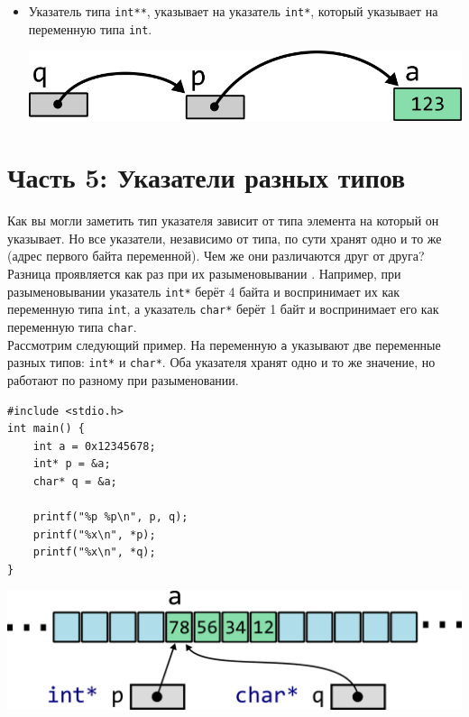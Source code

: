 \documentclass{article}
\begin{document}
\begin{itemize}
\item Указатель типа \texttt{int**}, указывает на указатель \texttt{int*}, который указывает на переменную типа \texttt{int}.
\begin{center}
\includegraphics[scale=1]{../images/pointer_tasks/pointer_tasks_pointer_to_pointer.png}
\end{center}
\end{itemize}



\newpage

\section*{Часть 5: Указатели разных типов}
Как вы могли заметить тип указателя зависит от типа элемента на который он указывает. Но все указатели, независимо от типа, по сути хранят одно и то же (адрес первого байта переменной). Чем же они различаются друг от друга? Разница проявляется как раз при их разыменовывании . Например, при разыменовывании указатель \texttt{int*} берёт 4 байта и воспринимает их как переменную типа \texttt{int}, а указатель \texttt{char*} берёт 1 байт и воспринимает его как переменную типа \texttt{char}.\\

Рассмотрим следующий пример. На переменную \texttt{a} указывают две переменные разных типов: \texttt{int*} и \texttt{char*}. Оба указателя хранят одно и то же значение, но работают по разному при разыменовании.

\begin{multicols}{2}
\begin{lstlisting}
#include <stdio.h>
int main() {
    int a = 0x12345678;
    int* p = &a;
    char* q = &a;
    
    printf("%p %p\n", p, q);
    printf("%x\n", *p);
    printf("%x\n", *q);
}
\end{lstlisting}
\vfill
\columnbreak
\hfill \break
\begin{center}
\includegraphics[scale=0.65]{../images/memory_int_char_pointer.png}
\end{center}
\hfill \break
\end{multicols}
\end{document}
